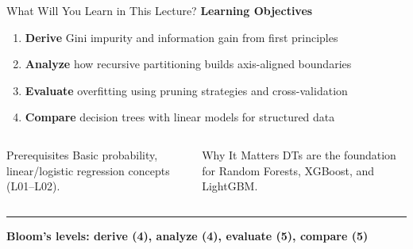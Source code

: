 \documentclass[8pt,aspectratio=169]{beamer}
\newcommand{\bottomnote}[1]{%
\vfill
\vspace{-2mm}
\textcolor{mllavender2}{\rule{\textwidth}{0.4pt}}
\vspace{1mm}
\footnotesize
\textbf{#1}
}
\newcommand{\highlight}[1]{\textcolor{mlorange}{\textbf{#1}}}
\begin{document}
\begin{frame}[t]{What Will You Learn in This Lecture?}
\small
\textbf{Learning Objectives}
\begin{enumerate}
\item \footnotesize \highlight{Derive} Gini impurity and information gain from first principles
\item \footnotesize \highlight{Analyze} how recursive partitioning builds axis-aligned boundaries
\item \footnotesize \highlight{Evaluate} overfitting using pruning strategies and cross-validation
\item \footnotesize \highlight{Compare} decision trees with linear models for structured data
\end{enumerate}

\vspace{4mm}
\begin{columns}[T]
\begin{block}{Prerequisites}
\footnotesize Basic probability, linear/logistic regression concepts (L01--L02).
\end{block}

\begin{block}{Why It Matters}
\footnotesize DTs are the foundation for Random Forests, XGBoost, and LightGBM.
\end{block}
\end{columns}
\bottomnote{Bloom's levels: derive (4), analyze (4), evaluate (5), compare (5)}
\end{frame}
\end{document}
